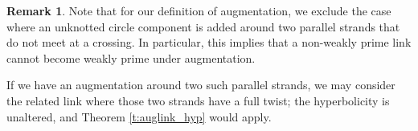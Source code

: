 \documentclass[11pt]{amsart}
\newcommand{\thmref}[1]{Theorem \ref{#1}}
\theoremstyle{plain}
\theoremstyle{definition}
\newtheorem{remark}[theorem]{Remark}
\begin{document}
\begin{remark}
Note that for our definition of augmentation,
we exclude the case where
an unknotted circle component is added around
two parallel strands that do not meet at a crossing.
In particular, this implies that
a non-weakly prime link cannot become weakly prime
under augmentation.


If we have an augmentation around two such parallel strands,
we may consider the related link
where those two strands have a full twist;
the hyperbolicity is unaltered, and
\thmref{t:auglink_hyp} would apply.
\end{remark}





\end{document}
